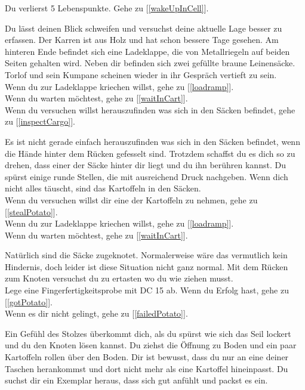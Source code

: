 Du verlierst 5 Lebenspunkte.
Gehe zu [\ref{wakeUpInCell}].

Du lässt deinen Blick schweifen und versuchst deine aktuelle Lage besser zu erfassen. Der Karren ist aus Holz und hat schon bessere Tage gesehen. Am hinteren Ende befindet sich eine Ladeklappe, die von Metallriegeln auf beiden Seiten gehalten wird. Neben dir befinden sich zwei gefüllte braune Leinensäcke. Torlof und sein Kumpane scheinen wieder in ihr Gespräch vertieft zu sein.
\\Wenn du zur Ladeklappe kriechen willst, gehe zu [\ref{loadramp}].
\\Wenn du warten möchtest, gehe zu [\ref{waitInCart}].
\\Wenn du versuchen willst herauszufinden was sich in den Säcken befindet, gehe zu [\ref{inspectCargo}].


Es ist nicht gerade einfach herauszufinden was sich in den Säcken befindet, wenn die Hände hinter dem Rücken gefesselt sind. Trotzdem schaffst du es dich so zu drehen, dass einer der Säcke hinter dir liegt und du ihn berühren kannst. Du spürst einige runde Stellen, die mit ausreichend Druck nachgeben. Wenn dich nicht alles täuscht, sind das Kartoffeln in den Säcken.
\\Wenn du versuchen willst dir eine der Kartoffeln zu nehmen, gehe zu [\ref{stealPotato}].
\\Wenn du zur Ladeklappe kriechen willst, gehe zu [\ref{loadramp}].
\\Wenn du warten möchtest, gehe zu [\ref{waitInCart}].


Natürlich sind die Säcke zugeknotet. Normalerweise wäre das vermutlich kein Hindernis, doch leider ist diese Situation nicht ganz normal. Mit dem Rücken zum Knoten versuchst du zu ertasten wo du wie ziehen musst.
\\Lege eine Fingerfertigkeitsprobe mit DC 15 ab. Wenn du Erfolg hast, gehe zu [\ref{gotPotato}].
\\Wenn es dir nicht gelingt, gehe zu [\ref{failedPotato}].


Ein Gefühl des Stolzes überkommt dich, als du spürst wie sich das Seil lockert und du den Knoten lösen kannst. Du ziehst die Öffnung zu Boden und ein paar Kartoffeln rollen über den Boden. Dir ist bewusst, dass du nur an eine deiner Taschen herankommst und dort nicht mehr als eine Kartoffel hineinpasst. Du suchst dir ein Exemplar heraus, dass sich gut anfühlt und packst es ein.

